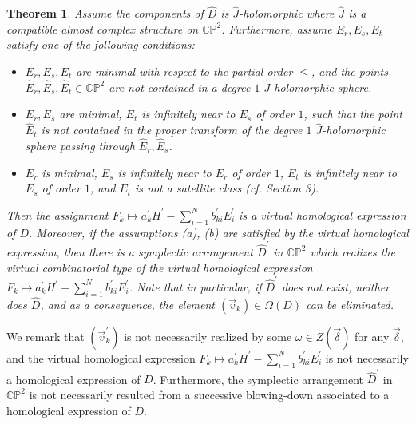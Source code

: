 \documentclass[11pt]{amsart}
\theoremstyle{plain}
\newtheorem{theorem}{Theorem}
\numberwithin{theorem}{section}
\theoremstyle{definition}
\newcommand{\C}{{\mathbb C}}
\renewcommand{\P}{{\mathbb P}}
\begin{document}
\begin{theorem}
Assume the components of $\hat{D}$ is $\hat{J}$-holomorphic where $\hat{J}$ is a compatible almost complex structure on $\C\P^2$. Furthermore, assume $E_r,E_s,E_t$ satisfy one of the following conditions:
\begin{itemize}
\item [{(1)}] $E_r,E_s,E_t$ are minimal with respect to the partial order $\leq$, and the points 
$\hat{E}_r,\hat{E}_s,\hat{E}_t\in \C\P^2$ are not contained in a degree $1$ $\hat{J}$-holomorphic sphere. 
\item [{(2)}] $E_r,E_s$ are minimal, $E_t$ is infinitely near to $E_s$ of order $1$, such that the
point $\hat{E}_t$ is not contained in the proper transform of the degree $1$ $\hat{J}$-holomorphic sphere passing through $\hat{E}_r,\hat{E}_s$.
\item [{(3)}] $E_r$ is minimal, $E_s$ is infinitely near to $E_r$ of order $1$, $E_t$ 
is infinitely near to $E_s$ of order $1$, and $E_t$ is not a satellite class (cf. Section 3). 
\end{itemize}
Then the assignment $F_k\mapsto a_k^\prime H^\prime-\sum_{i=1}^N b_{ki}^\prime E_i^\prime$ is a virtual
homological expression of $D$. Moreover, if the assumptions {\em (a)}, {\em (b)} are satisfied by the virtual homological expression, then there is a symplectic arrangement $\hat{D}^\prime$ in $\C\P^2$ which realizes the virtual combinatorial type of the virtual homological expression $F_k\mapsto a_k^\prime H^\prime-\sum_{i=1}^N b_{ki}^\prime E_i^\prime$. Note that in particular, if $\hat{D}^\prime$ does not exist, neither does $\hat{D}$, and as a
consequence, the element $(\vec{v}_k)\in\Omega(D)$ can be eliminated. 
\end{theorem}

We remark that $(\vec{v}_k^\prime)$ is not necessarily realized by some $\omega\in Z(\vec{\delta})$ for any 
$\vec{\delta}$, and the virtual homological expression  
$F_k\mapsto a_k^\prime H^\prime-\sum_{i=1}^N b_{ki}^\prime E_i^\prime$ is not necessarily a homological expression of $D$. Furthermore, the symplectic arrangement $\hat{D}^\prime$ in $\C\P^2$ is not necessarily 
resulted from a successive blowing-down associated to a homological expression of $D$.
\end{document}
